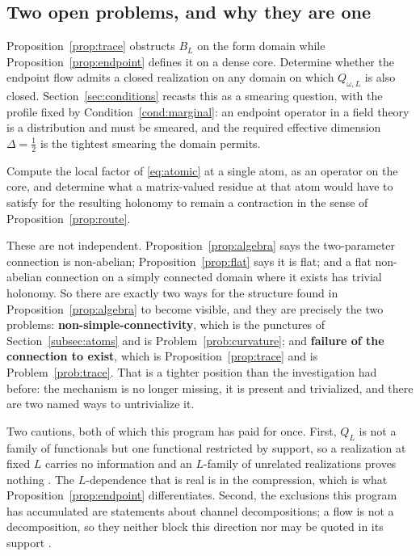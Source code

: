 \subsection{Two open problems, and why they are one}

\begin{problem}
\label{prob:trace}
Proposition~\ref{prop:trace} obstructs $B_L$ on the form domain while
Proposition~\ref{prop:endpoint} defines it on a dense core. Determine whether the
endpoint flow admits a closed realization on any domain on which $Q_{\omega,L}$ is
also closed. Section~\ref{sec:conditions} recasts this as a smearing question,
with the profile fixed by Condition~\ref{cond:marginal}: an endpoint operator in
a field theory is a distribution and must be smeared, and the required effective
dimension $\Delta=\frac12$ is the tightest smearing the domain permits.
\end{problem}

\begin{problem}\label{prob:curvature}
Compute the local factor of \eqref{eq:atomic} at a single atom, as an operator on
the core, and determine what a matrix-valued residue at that atom would have to
satisfy for the resulting holonomy to remain a contraction in the sense of
Proposition~\ref{prop:route}.
\end{problem}

These are not independent. Proposition~\ref{prop:algebra} says the two-parameter
connection is non-abelian; Proposition~\ref{prop:flat} says it is flat; and a flat
non-abelian connection on a simply connected domain where it exists has trivial
holonomy. So there are exactly two ways for the structure found in
Proposition~\ref{prop:algebra} to become visible, and they are precisely the two
problems: \textbf{non-simple-connectivity}, which is the punctures of
Section~\ref{subsec:atoms} and is Problem~\ref{prob:curvature}; and \textbf{failure
of the connection to exist}, which is Proposition~\ref{prop:trace} and is
Problem~\ref{prob:trace}. That is a tighter position than the investigation had
before: the mechanism is no longer missing, it is present and trivialized, and
there are two named ways to untrivialize it.

\begin{remark}\label{rem:not-a-family}
Two cautions, both of which this program has paid for once. First, $Q_L$ is not a
family of functionals but one functional restricted by support, so a realization
at fixed $L$ carries no information and an $L$-family of unrelated realizations
proves nothing \cite{InverseBulk}. The $L$-dependence that is real is in the
compression, which is what Proposition~\ref{prop:endpoint} differentiates.
Second, the exclusions this program has accumulated are statements about channel
decompositions; a flow is not a decomposition, so they neither block this
direction nor may be quoted in its support \cite{ExclusionMap}.
\end{remark}

